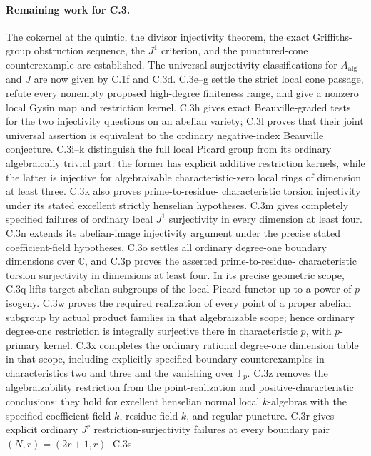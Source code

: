 \paragraph{Remaining work for C.3.}
The cokernel at the quintic, the divisor injectivity theorem, the exact
Griffiths-group obstruction sequence, the $J^1$ criterion, and the
punctured-cone counterexample are established. The universal
surjectivity classifications for $A_{\mathrm{alg}}$ and $J$ are now
given by C.1f and C.3d. C.3e--g settle the strict local cone
passage, refute every nonempty proposed high-degree finiteness
range, and give a nonzero local Gysin map and restriction kernel.
C.3h gives exact Beauville-graded tests for the two injectivity
questions on an abelian variety; C.3l proves that their joint
universal assertion is equivalent to the ordinary negative-index
Beauville conjecture. C.3i--k distinguish the full local Picard
group from its ordinary algebraically trivial part: the former
has explicit additive restriction kernels, while the latter is
injective for algebraizable characteristic-zero local rings of
dimension at least three. C.3k also proves prime-to-residue-
characteristic torsion injectivity under its stated excellent
strictly henselian hypotheses. C.3m gives completely specified
failures of ordinary local $J^1$ surjectivity in every dimension
at least four. C.3n extends its abelian-image injectivity argument
under the precise stated coefficient-field hypotheses. C.3o
settles all ordinary degree-one boundary dimensions over
$\mathbb C$, and C.3p proves the asserted prime-to-residue-
characteristic torsion surjectivity in dimensions at least four.
In its precise geometric scope, C.3q lifts target abelian
subgroups of the local Picard functor up to a power-of-$p$
isogeny. C.3w proves the required realization of every
point of a proper abelian subgroup by actual product
families in that algebraizable scope; hence ordinary
degree-one restriction is integrally surjective there
in characteristic $p$, with $p$-primary kernel.
C.3x completes the ordinary rational degree-one dimension
table in that scope, including explicitly specified boundary
counterexamples in characteristics two and three and the
vanishing over $\overline{\mathbb F}_p$. C.3z removes the
algebraizability restriction from the point-realization and
positive-characteristic conclusions: they hold for excellent
henselian normal local $k$-algebras with the specified
coefficient field $k$, residue field $k$, and regular puncture.
C.3r gives explicit ordinary $J^r$ restriction-surjectivity
failures at every boundary pair $(N,r)=(2r+1,r)$. C.3s
